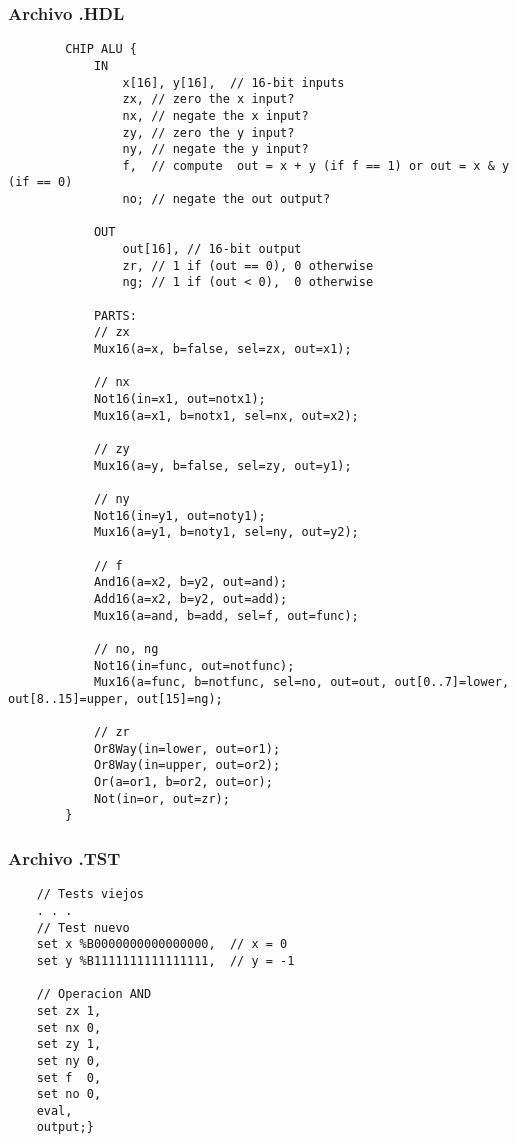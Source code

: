 \documentclass[12pt]{article}
\begin{document}
        \subsubsection{Archivo .HDL}
            \begin{lstlisting}
        CHIP ALU {
            IN
                x[16], y[16],  // 16-bit inputs
                zx, // zero the x input?
                nx, // negate the x input?
                zy, // zero the y input?
                ny, // negate the y input?
                f,  // compute  out = x + y (if f == 1) or out = x & y (if == 0)
                no; // negate the out output?
        
            OUT
                out[16], // 16-bit output
                zr, // 1 if (out == 0), 0 otherwise
                ng; // 1 if (out < 0),  0 otherwise
        
            PARTS:
            // zx
            Mux16(a=x, b=false, sel=zx, out=x1);
        
            // nx
            Not16(in=x1, out=notx1);
            Mux16(a=x1, b=notx1, sel=nx, out=x2);
        
            // zy
            Mux16(a=y, b=false, sel=zy, out=y1);
        
            // ny
            Not16(in=y1, out=noty1);
            Mux16(a=y1, b=noty1, sel=ny, out=y2);
        
            // f
            And16(a=x2, b=y2, out=and);
            Add16(a=x2, b=y2, out=add);
            Mux16(a=and, b=add, sel=f, out=func);
        
            // no, ng
            Not16(in=func, out=notfunc);
            Mux16(a=func, b=notfunc, sel=no, out=out, out[0..7]=lower, out[8..15]=upper, out[15]=ng);
        
            // zr
            Or8Way(in=lower, out=or1);
            Or8Way(in=upper, out=or2);
            Or(a=or1, b=or2, out=or);
            Not(in=or, out=zr);
        }
            \end{lstlisting}
        \subsubsection{Archivo .TST}
\begin{lstlisting}
    // Tests viejos
    . . .
    // Test nuevo
    set x %B0000000000000000,  // x = 0
    set y %B1111111111111111,  // y = -1
    
    // Operacion AND
    set zx 1,
    set nx 0,
    set zy 1,
    set ny 0,
    set f  0,
    set no 0,
    eval,
    output;}
\end{lstlisting}    
\end{document}

